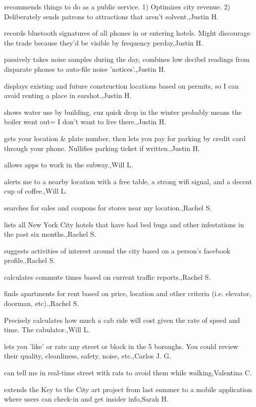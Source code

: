 \documentclass{article}
\begin{document}
recommends things to do as a public service. 1) Optimizes city revenue. 2) Deliberately sends patrons to attractions that aren't solvent.,Justin H.

records bluetooth signatures of all phones in or entering hotels. Might discourage the trade because they'd be visible by frequency perday,Justin H.

passively takes noise samples during the day, combines low decibel readings from disparate phones to auto-file noise 'notices'.,Justin H.

displays existing and future construction locations based on permits, so I can avoid renting a place in earshot.,Justin H.

shows water use by building, cuz quick drop in the winter probably means the boiler went out= I don't want to live there.,Justin H.

gets your location \& plate number, then lets you pay for parking by credit card through your phone. Nullifies parking ticket if written.,Justin H.

allows apps to work in the subway.,Will L.

alerts me to a nearby location with a free table, a strong wifi signal, and a decent cup of coffee.,Will L.

searches for sales and coupons for stores near my location.,Rachel S.

lists all New York City hotels that have had bed bugs and other infestations in the past six months.,Rachel S.

suggests activities of interest around the city based on a person's facebook profile.,Rachel S.

calculates commute times based on current traffic reports.,Rachel S.

finds apartments for rent based on price, location and other criteria (i.e. elevator, doorman, etc).,Rachel S.

Precisely calculates how much a cab ride will cost given the rate of speed and time. The cabulator.,Will L.

lets you 'like' or rate any street or block in the 5 boroughs. You could review their quality, cleanliness, safety, noise, etc.,Carlos J.  G.

can tell me in real-time street with rats to avoid them while walking,Valentina C.

extends the Key to the City art project from last summer to a mobile application where users can check-in and get insider info,Sarah H.
\end{document}
